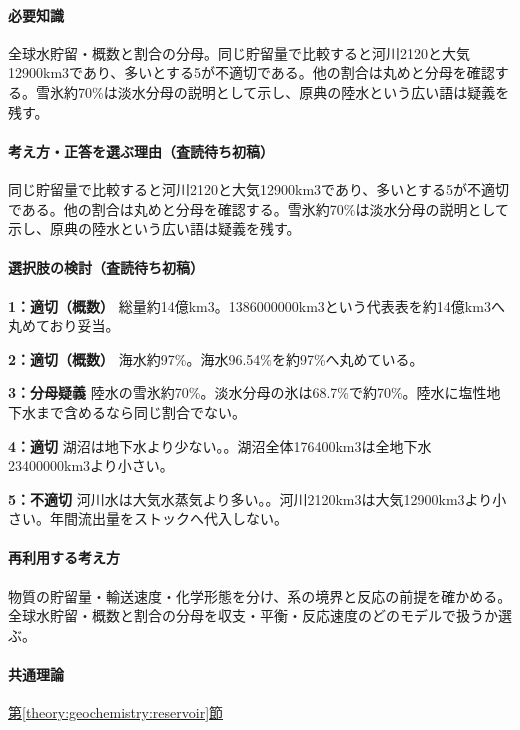 \paragraph{必要知識} 全球水貯留・概数と割合の分母。同じ貯留量で比較すると河川2120と大気12900km3であり、多いとする5が不適切である。他の割合は丸めと分母を確認する。雪氷約70\%は淡水分母の説明として示し、原典の陸水という広い語は疑義を残す。

\paragraph{考え方・正答を選ぶ理由（査読待ち初稿）} 同じ貯留量で比較すると河川2120と大気12900km3であり、多いとする5が不適切である。他の割合は丸めと分母を確認する。雪氷約70\%は淡水分母の説明として示し、原典の陸水という広い語は疑義を残す。

\paragraph{選択肢の検討（査読待ち初稿）}\mbox{}\par

\noindent\textbf{1：適切（概数）} 総量約14億km3。1386000000km3という代表表を約14億km3へ丸めており妥当。\par

\noindent\textbf{2：適切（概数）} 海水約97\%。海水96.54\%を約97\%へ丸めている。\par

\noindent\textbf{3：分母疑義} 陸水の雪氷約70\%。淡水分母の氷は68.7\%で約70\%。陸水に塩性地下水まで含めるなら同じ割合でない。\par

\noindent\textbf{4：適切} 湖沼は地下水より少ない。。湖沼全体176400km3は全地下水23400000km3より小さい。\par

\noindent\textbf{5：不適切} 河川水は大気水蒸気より多い。。河川2120km3は大気12900km3より小さい。年間流出量をストックへ代入しない。\par

\paragraph{再利用する考え方} 物質の貯留量・輸送速度・化学形態を分け、系の境界と反応の前提を確かめる。全球水貯留・概数と割合の分母を収支・平衡・反応速度のどのモデルで扱うか選ぶ。

\paragraph{共通理論} \hyperref[theory:geochemistry:reservoir]{第\ref*{theory:geochemistry:reservoir}節}

